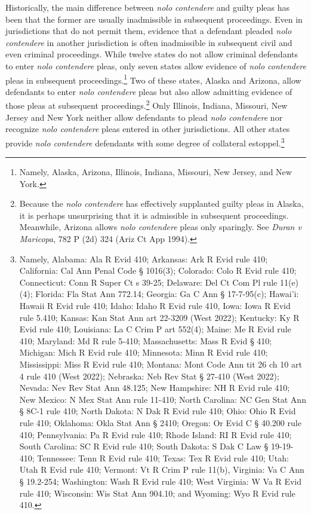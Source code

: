 Historically, the main difference between \textit{nolo contendere} and guilty pleas has been that the former are usually inadmissible in subsequent proceedings. Even in jurisdictions that do not permit them, evidence that a defendant pleaded \textit{nolo contendere} in another jurisdiction is often inadmissible in subsequent civil and even criminal proceedings. While twelve states do not allow criminal defendants to enter \textit{nolo contendere} pleas, only seven states allow evidence of \textit{nolo contendere} pleas in subsequent proceedings.\footnote{Namely, Alaska, Arizona, Illinois, Indiana, Missouri, New Jersey, and New York.} Two of these states, Alaska and Arizona, allow defendants to enter \textit{nolo contendere} pleas but also allow admitting evidence of those pleas at subsequent proceedings.\footnote{Because the \textit{nolo contendere} has effectively supplanted guilty pleas in Alaska, it is perhaps unsurprising that it is admissible in subsequent proceedings. Meanwhile, Arizona allows \textit{nolo contendere} pleas only sparingly. See \textit{Duran v Maricopa}, 782 P (2d) 324 (Ariz Ct App 1994).} Only Illinois, Indiana, Missouri, New Jersey and New York neither allow defendants to plead \textit{nolo contendere} nor recognize \textit{nolo contendere} pleas entered in other jurisdictions. All other states provide \textit{nolo contendere} defendants with some degree of collateral estoppel.\footnote{Namely, Alabama: Ala R Evid 410; Arkansas: Ark R Evid rule 410; California: Cal Ann Penal Code § 1016(3); Colorado: Colo R Evid rule 410; Connecticut: Conn R Super Ct s 39-25; Delaware: Del Ct Com Pl rule 11(e)(4); Florida: Fla Stat Ann 772.14; Georgia: Ga C Ann § 17-7-95(c); Hawai'i: Hawaii R Evid rule 410; Idaho: Idaho R Evid rule 410, Iowa: Iowa R Evid rule 5.410; Kansas: Kan Stat Ann art 22-3209 (West 2022); Kentucky: Ky R Evid rule 410; Louisiana: La C Crim P art 552(4); Maine: Me R Evid rule 410; Maryland: Md R rule 5-410; Massachusetts: Mass R Evid § 410; Michigan: Mich R Evid rule 410; Minnesota: Minn R Evid rule 410; Mississippi: Miss R Evid rule 410; Montana: Mont Code Ann tit 26 ch 10 art 4 rule 410 (West 2022); Nebraska: Neb Rev Stat § 27-410 (West 2022); Nevada: Nev Rev Stat Ann 48.125; New Hampshire: NH R Evid rule 410; New Mexico: N Mex Stat Ann rule 11-410; North Carolina: NC Gen Stat Ann § 8C-1 rule 410; North Dakota: N Dak R Evid rule 410; Ohio: Ohio R Evid rule 410; Oklahoma: Okla Stat Ann § 2410; Oregon: Or Evid C § 40.200 rule 410; Pennsylvania: Pa R Evid rule 410; Rhode Island: RI R Evid rule 410; South Carolina: SC R Evid rule 410; South Dakota: S Dak C Law § 19-19-410; Tennessee: Tenn R Evid rule 410; Texas: Tex R Evid rule 410; Utah: Utah R Evid rule 410; Vermont: Vt R Crim P rule 11(b), Virginia: Va C Ann § 19.2-254; Washington: Wash R Evid rule 410; West Virginia: W Va R Evid rule 410; Wisconsin: Wis Stat Ann 904.10; and Wyoming: Wyo R Evid rule 410.}

